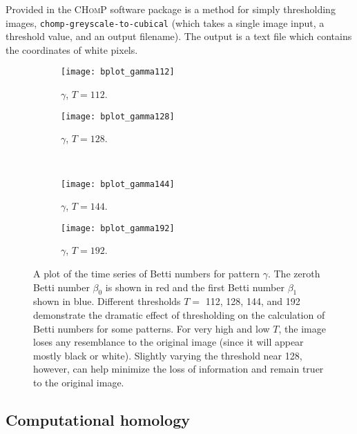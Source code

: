 Provided in the \textsc{CHomP} software package is a method for simply thresholding images, \texttt{chomp-greyscale-to-cubical} (which takes a single image input, a threshold value, and an output filename). The output is a text file which contains the coordinates of white pixels.

\begin{sidewaysfigure}[p]
	\centering
	\begin{subfigure}[b]{0.45\textwidth}
                \texttt{[image: bplot\_gamma112]}
                \caption{$\gamma$, $T = 112$.}
                \label{fig:bplot_gamma112}
        \end{subfigure} \quad
	\begin{subfigure}[b]{0.45\textwidth}
                \texttt{[image: bplot\_gamma128]}
                \caption{$\gamma$, $T = 128$.}
                \label{fig:bplot_gamma128}
        \end{subfigure} \hfill \\
	\begin{subfigure}[b]{0.45\textwidth}
                \texttt{[image: bplot\_gamma144]}
                \caption{$\gamma$, $T = 144$.}
                \label{fig:bplot_gamma144}
       \end{subfigure} \quad
       \begin{subfigure}[b]{0.45\textwidth}
                \texttt{[image: bplot\_gamma192]}
                \caption{$\gamma$, $T = 192$.}
                \label{fig:bplot_gamma192}
        \end{subfigure}
        
        \caption{A plot of the time series of Betti numbers for pattern $\gamma$. The zeroth Betti number $\beta_0$ is shown in red and the first Betti number $\beta_1$ shown in blue. Different thresholds $T =$ 112, 128, 144, and 192 demonstrate the dramatic effect of thresholding on the calculation of Betti numbers for some patterns. For very high and low $T$, the image loses any resemblance to the original image (since it will appear mostly black or white). Slightly varying the threshold near 128, however, can help minimize the loss of information and remain truer to the original image.} \label{fig:bplots_gamma}
\end{sidewaysfigure}

\newpage
\subsection{Computational homology} \label{sect:chomping}

